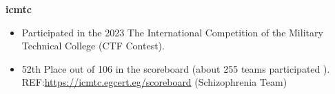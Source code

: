 \documentclass[a4paper]{article}
\begin{document}
\textbf{icmtc}\\
\begin{itemize} \itemsep 1pt
	\item Participated in the 2023  The International Competition of the Military Technical College (CTF Contest).
	\item 52th Place out of 106 in the scoreboard (about 255 teams participated ). REF:\url{https://icmtc.egcert.eg/scoreboard} (Schizophrenia Team)
\end{itemize}
\end{document}
